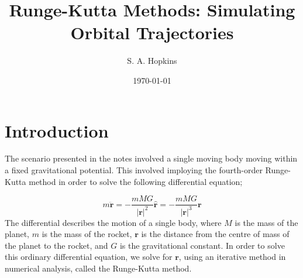\documentclass{revtex4-2}
\begin{document}
\title{Runge-Kutta Methods: Simulating Orbital Trajectories}
\author{S. A. Hopkins}
\date{\today}

\maketitle
\section{Introduction}
The scenario presented in the notes involved a single moving body moving within a fixed gravitational potential. This involved imploying the fourth-order Runge-Kutta
method in order to solve the following differential equation;

\begin{equation}
    m\ddot{\boldsymbol{r}} = -\frac{mMG}{|\boldsymbol{r}|^2}\hat{\boldsymbol{r}} = - \frac{mMG}{|\boldsymbol{r}|^3}\boldsymbol{r}
\end{equation}
The differential describes the motion of a single body, where $M$ is the mass of the planet, $m$ is the mass of the rocket, $\boldsymbol{r}$ is the distance from the centre of mass
of the planet to the rocket, and $G$ is the gravitational constant. In order to solve this ordinary differential equation, we solve for $\boldsymbol{r}$, using an iterative method
in numerical analysis, called the Runge-Kutta method.
\end{document}
